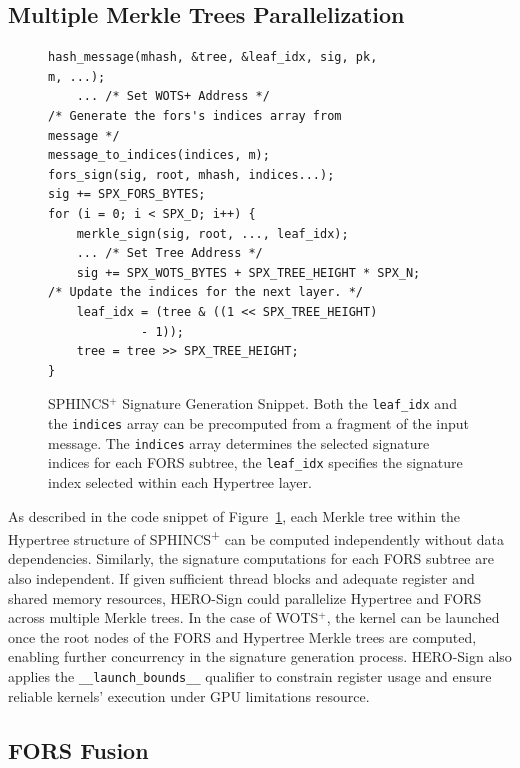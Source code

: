 \documentclass[10pt,conference]{IEEEtran}
\begin{document}
\subsection{Multiple Merkle Trees Parallelization} 
\label{sec:MMTP}
\begin{figure}[!ht]
\centering
\begin{lstlisting}[style=imageStyle, caption={SPHINCS$^+$ Signature Generation Snippet}]
hash_message(mhash, &tree, &leaf_idx, sig, pk, 
m, ...);
    ... /* Set WOTS+ Address */
/* Generate the fors's indices array from 
message */
message_to_indices(indices, m);
fors_sign(sig, root, mhash, indices...);
sig += SPX_FORS_BYTES;
for (i = 0; i < SPX_D; i++) {
    merkle_sign(sig, root, ..., leaf_idx);
    ... /* Set Tree Address */
    sig += SPX_WOTS_BYTES + SPX_TREE_HEIGHT * SPX_N;
/* Update the indices for the next layer. */
    leaf_idx = (tree & ((1 << SPX_TREE_HEIGHT) 
             - 1));
    tree = tree >> SPX_TREE_HEIGHT;
}
\end{lstlisting}
\caption{SPHINCS$^+$ Signature Generation Snippet. Both the \texttt{leaf\_idx} and the \texttt{indices} array can be precomputed from a fragment of the input message. The \texttt{indices} array determines the selected signature indices for each FORS subtree, the \texttt{leaf\_idx} specifies the signature index selected within each Hypertree layer.}
\label{fig:leaf}
\end{figure}






As described in the code snippet of Figure~\ref{fig:leaf}, each Merkle tree within the Hypertree structure of SPHINCS\textsuperscript{+} can be computed independently without data dependencies. Similarly, the signature computations for each FORS subtree are also independent. If given sufficient thread blocks and adequate register and shared memory resources, HERO-Sign could parallelize Hypertree and FORS across multiple Merkle trees. In the case of WOTS$^+$, the kernel can be launched once the root nodes of the FORS and Hypertree Merkle trees are computed, enabling further concurrency in the signature generation process. HERO-Sign also applies the \texttt{\_\_launch\_bounds\_\_} qualifier to constrain register usage and ensure reliable kernels' execution under GPU limitations resource.

\subsection{FORS Fusion}
\label{sec:FS}
\end{document}
